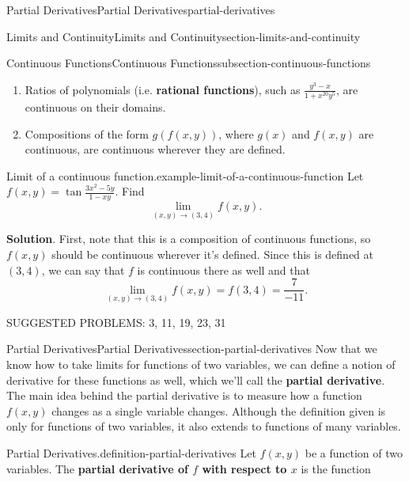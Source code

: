 \documentclass[oneside,10pt,]{book}
\newcommand{\terminology}[1]{\textbf{#1}}
\numberwithin{equation}{section}
\begin{document}
\begin{chapterptx}{Partial Derivatives}{}{Partial Derivatives}{}{}{partial-derivatives}
\begin{sectionptx}{Limits and Continuity}{}{Limits and Continuity}{}{}{section-limits-and-continuity}
\begin{subsectionptx}{Continuous Functions}{}{Continuous Functions}{}{}{subsection-continuous-functions}
\begin{enumerate}
\item\hypertarget{li-135}{}Ratios of polynomials (i.e. \terminology{rational functions}), such as \(\frac{y^{3}-x}{1+x^{20}y^{5}}\), are continuous on their domains.%
\item\hypertarget{li-136}{}Compositions of the form \(g(f(x,y))\), where \(g(x)\) and \(f(x,y)\) are continuous, are continuous wherever they are defined.%
\end{enumerate}
\begin{example}{Limit of a continuous function.}{example-limit-of-a-continuous-function}%
\hypertarget{p-1353}{}%
Let \(f(x,y) = \tan\frac{3x^{2}-5y}{1-xy}\). Find%
\begin{equation*}
\lim_{(x,y)\to(3,4)}f(x,y).
\end{equation*}
%
\par\smallskip%
\noindent\textbf{Solution}.\hypertarget{solution-216}{}\quad%
\hypertarget{p-1354}{}%
First, note that this is a composition of continuous functions, so \(f(x,y)\) should be continuous wherever it's defined. Since this is defined at \((3,4)\), we can say that \(f\) is continuous there as well and that%
\begin{equation*}
\lim_{(x,y)\to(3,4)}f(x,y) = f(3,4) = \frac{7}{-11}.
\end{equation*}
%
\end{example}
\end{subsectionptx}
\hypertarget{p-1355}{}%
SUGGESTED PROBLEMS: 3, 11, 19, 23, 31%
\end{sectionptx}
%
%
\typeout{************************************************}
\typeout{************************************************}
%
\begin{sectionptx}{Partial Derivatives}{}{Partial Derivatives}{}{}{section-partial-derivatives}
Now that we know how to take limits for functions of two variables, we can define a notion of derivative for these functions as well, which we'll call the \terminology{partial derivative}. The main idea behind the partial derivative is to measure how a function \(f(x,y)\) changes as a single variable changes. Although the definition given is only for functions of two variables, it also extends to functions of many variables.\begin{definition}{Partial Derivatives.}{definition-partial-derivatives}%
\hypertarget{p-1356}{}%
Let \(f(x,y)\) be a function of two variables. The \terminology{partial derivative of \(f\) with respect to \(x\)} is the function%
\begin{equation*}

\end{equation*}
\end{definition}
\end{sectionptx}
\end{chapterptx}
\end{document}
